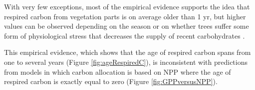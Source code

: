 \documentclass[12pt, a4paper]{article}
\begin{document}
With very few exceptions, most of the empirical evidence supports the idea that respired carbon from vegetation parts is on average older than 1 yr, but higher values can be observed depending on the season or on whether trees suffer some form of physiological stress that decreases the supply of recent carbohydrates \citep{Herrera2020}. 

This empirical evidence, which shows that the age of respired carbon spans from one to several years (Figure \ref{fig:ageRespiredC}), is inconsistent with predictions from models in which carbon allocation is based on NPP where the age of respired carbon is exactly equal to zero (Figure \ref{fig:GPPversusNPP}). 


\end{document}
